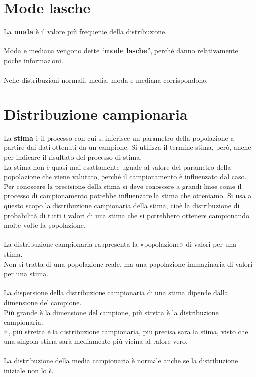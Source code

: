 \documentclass[drafts, 10pt]{book}
\begin{document}
\section{Mode lasche}
La \textbf{moda} è il valore più frequente della distribuzione.
\\
\\
Moda e mediana vengono dette “\textbf{mode lasche}”, perché danno relativamente poche informazioni.
\\
\\
Nelle distribuzioni normali, media, moda e mediana corrispondono.

\section{Distribuzione campionaria}
La \textbf{stima} è il processo con cui si inferisce un parametro della popolazione a partire dai dati ottenuti da un campione. Si utilizza il termine stima, però, anche per indicare il risultato del processo di stima.
\\
La stima non è quasi mai esattamente uguale al valore del parametro della popolazione che viene valutato, perché il campionamento è influenzato dal caso.
\\
Per conoscere la precisione della stima si deve conoscere a grandi linee come il processo di campionamento potrebbe influenzare la stima che otteniamo. Si usa a questo scopo la distribuzione campionaria della stima, cioè la distribuzione di probabilità di tutti i valori di una stima che si potrebbero ottenere campionando molte volte la popolazione.
\\
\\
La distribuzione campionaria rappresenta la «popolazione» di valori per una stima. 
\\
Non si tratta di una popolazione reale, ma una popolazione immaginaria di valori per una stima.
\\
\\
La dispersione della distribuzione campionaria di una stima dipende dalla dimensione del campione. 
\\
Più grande è la dimensione del campione, più stretta è la distribuzione campionaria. 
\\
E, più stretta è la distribuzione campionaria, più precisa sarà la stima, visto che una singola stima sarà mediamente più vicina al valore vero.
\\
\\
La distribuzione della media campionaria è normale anche se la distribuzione iniziale non lo è.
\end{document}
